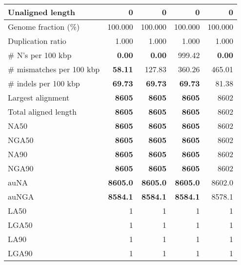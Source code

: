 \documentclass[12pt,a4paper]{article}
\begin{document}
\begin{table}[ht]
\begin{center}
\begin{tabular}{|l*{4}{|r}|}
Unaligned length & 0 & 0 & 0 & 0 \\ \hline
Genome fraction (\%) & 100.000 & 100.000 & 100.000 & 100.000 \\ \hline
Duplication ratio & 1.000 & 1.000 & 1.000 & 1.000 \\ \hline
\# N's per 100 kbp & {\bf 0.00} & {\bf 0.00} & 999.42 & {\bf 0.00} \\ \hline
\# mismatches per 100 kbp & {\bf 58.11} & 127.83 & 360.26 & 465.01 \\ \hline
\# indels per 100 kbp & {\bf 69.73} & {\bf 69.73} & {\bf 69.73} & 81.38 \\ \hline
Largest alignment & {\bf 8605} & {\bf 8605} & {\bf 8605} & 8602 \\ \hline
Total aligned length & {\bf 8605} & {\bf 8605} & {\bf 8605} & 8602 \\ \hline
NA50 & {\bf 8605} & {\bf 8605} & {\bf 8605} & 8602 \\ \hline
NGA50 & {\bf 8605} & {\bf 8605} & {\bf 8605} & 8602 \\ \hline
NA90 & {\bf 8605} & {\bf 8605} & {\bf 8605} & 8602 \\ \hline
NGA90 & {\bf 8605} & {\bf 8605} & {\bf 8605} & 8602 \\ \hline
auNA & {\bf 8605.0} & {\bf 8605.0} & {\bf 8605.0} & 8602.0 \\ \hline
auNGA & {\bf 8584.1} & {\bf 8584.1} & {\bf 8584.1} & 8578.1 \\ \hline
LA50 & 1 & 1 & 1 & 1 \\ \hline
LGA50 & 1 & 1 & 1 & 1 \\ \hline
LA90 & 1 & 1 & 1 & 1 \\ \hline
LGA90 & 1 & 1 & 1 & 1 \\ \hline
\end{tabular}
\end{center}
\end{table}
\end{document}
